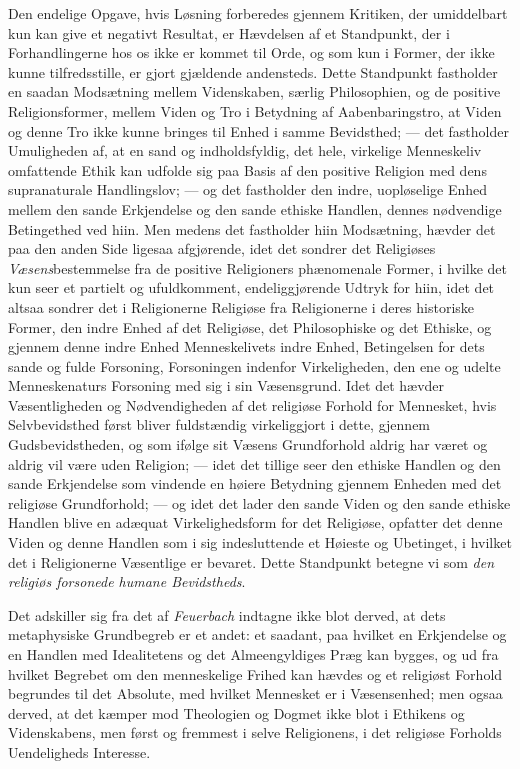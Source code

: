 \documentclass[12pt,a4paper]{book}
\newcommand{\opage}[1]{\marginnote{\footnotesize\textit{[#1]}}}
\begin{document}
Den endelige Opgave, hvis Løsning forberedes gjennem Kritiken, der
umiddelbart kun kan give et negativt Resultat, er Hævdelsen af et
Standpunkt, der i Forhandlingerne hos os ikke er kommet til Orde, og
som kun i Former, der ikke kunne tilfredsstille, er gjort gjældende
andensteds. Dette Standpunkt fastholder en saadan Modsætning mellem
Videnskaben, særlig Philosophien, og de positive Religionsformer,
mellem Viden og Tro i Betydning af Aabenbaringstro, at \opage{5}Viden og denne
Tro ikke kunne bringes til Enhed i samme Bevidsthed; --- det fastholder
Umuligheden af, at en sand og indholdsfyldig, det hele, virkelige
Menneskeliv omfattende Ethik kan udfolde sig paa Basis af den positive
Religion med dens supranaturale Handlingslov; --- og det fastholder den
indre, uopløselige Enhed mellem den sande Erkjendelse og den sande
ethiske Handlen, dennes nødvendige Betingethed ved hiin. Men medens
det fastholder hiin Modsætning, hævder det paa den anden Side ligesaa
afgjørende, idet det sondrer det Religiøses \emph{Væsens}bestemmelse fra de
positive Religioners phænomenale Former, i hvilke det kun seer et
partielt og ufuldkomment, endeliggjørende Udtryk for hiin, idet det
altsaa sondrer det i Religionerne Religiøse fra Religionerne i deres
historiske Former, den indre Enhed af det Religiøse, det Philosophiske
og det Ethiske, og gjennem denne indre Enhed Menneskelivets indre
Enhed, Betingelsen for dets sande og fulde Forsoning, Forsoningen
indenfor Virkeligheden, den ene og udelte Menneskenaturs Forsoning med
sig i sin Væsensgrund. Idet det hævder Væsentligheden og
Nødvendigheden af det religiøse Forhold for Mennesket, hvis
Selvbevidsthed først bliver fuldstændig virkeliggjort i dette, gjennem
Gudsbevidstheden, og som ifølge sit Væsens Grundforhold aldrig har
været og aldrig vil være uden Religion; --- idet det tillige seer den
ethiske Handlen og den sande Erkjendelse som vindende en høiere
Betydning gjennem Enheden med det religiøse Grundforhold; --- og idet
det lader den sande Viden og den sande ethiske Handlen blive en
adæquat Virkelighedsform for det Religiøse, opfatter det denne Viden
og denne Handlen som i sig indesluttende et Høieste og Ubetinget, i
hvilket det i Religionerne Væsentlige er bevaret. Dette Standpunkt
betegne vi som \emph{den religiøs forsonede humane Bevidstheds}.

Det adskiller sig fra det af \emph{Feuerbach} indtagne ikke blot derved, at
dets metaphysiske Grundbegreb er et andet: et saadant, paa hvilket
en Erkjendelse og en Handlen med Idealitetens og det Almeengyldiges
Præg kan bygges, \opage{6}og ud fra hvilket Begrebet om den menneskelige Frihed
kan hævdes og et religiøst Forhold begrundes til det Absolute, med
hvilket Mennesket er i Væsensenhed; men ogsaa derved, at det
kæmper mod Theologien og Dogmet ikke blot i Ethikens og Videnskabens,
men først og fremmest i selve Religionens, i det religiøse Forholds
Uendeligheds Interesse.
\end{document}
